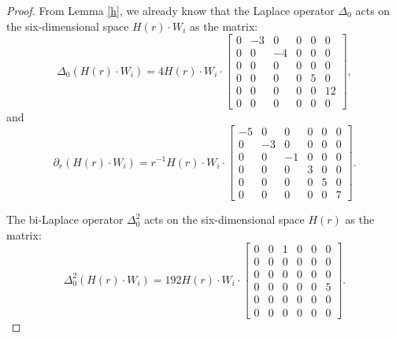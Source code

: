 \documentclass[11pt,letterpaper]{amsart}
\theoremstyle{definition}
\theoremstyle{remark}
\numberwithin{equation}{section}
\begin{document}
\begin{proof}
    From Lemma \ref{h}, we already know that 
    the Laplace operator $\Delta_0$ acts on the six-dimensional space $H(r)\cdot W_i$ as the matrix:
\begin{equation}
    \Delta_0(H(r)\cdot W_i)=4H(r)\cdot W_i\cdot 
    \begin{bmatrix}
0 & -3 & 0 & 0 & 0& 0\\
0 & 0 & -4 & 0 & 0& 0\\
0 & 0 & 0 & 0 & 0& 0\\
0 & 0 & 0 & 0 & 5& 0\\
0 & 0 & 0 & 0 & 0& 12\\
0 & 0 & 0 & 0 & 0& 0
\end{bmatrix},
\end{equation}
and
\begin{equation*}
        \partial_r \left(H(r)\cdot W_i\right)=r^{-1}H(r)\cdot W_i\cdot\begin{bmatrix}
-5 & 0 & 0 & 0 & 0& 0\\
0 & -3 & 0 & 0 & 0& 0\\
0 & 0 & -1 & 0 & 0& 0\\
0 & 0 & 0 & 3 & 0& 0\\
0 & 0 & 0 & 0 & 5& 0\\
0 & 0 & 0 & 0 & 0& 7
        \end{bmatrix}.
    \end{equation*}

The bi-Laplace operator $\Delta^2_0$ acts on the six-dimensional space $H(r)$ as the matrix:
\begin{equation}
    \Delta^2_0(H(r)\cdot W_i)=192H(r)\cdot W_i\cdot 
     \begin{bmatrix}
0 & 0 & 1 & 0 & 0& 0\\
0 & 0 & 0 & 0 & 0& 0\\
0 & 0 & 0 & 0 & 0& 0\\
0 & 0 & 0 & 0 & 0& 5\\
0 & 0 & 0 & 0 & 0& 0\\
0 & 0 & 0 & 0 & 0& 0
\end{bmatrix}.
\end{equation}


\end{proof}
\end{document}
